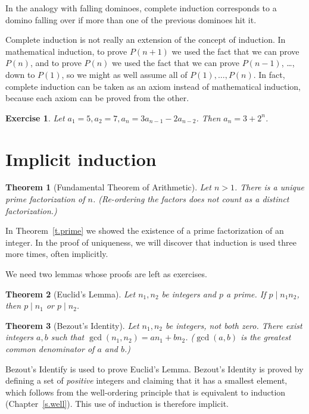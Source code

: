 \documentclass[11pt,a4paper]{report}
\newtheorem{theorem}{Theorem}
\newtheorem{exercise}{Exercise}
\begin{document}
In the analogy with falling dominoes, complete induction corresponds to a domino falling over if more than one of the previous dominoes hit it.

Complete induction is not really an extension of the concept of induction. In mathematical induction, to prove $P(n+1)$ we used the fact that we can prove $P(n)$, and to prove $P(n)$ we used the fact that we can prove $P(n-1)$, \ldots, down to $P(1)$, so we might as well assume all of $P(1),\ldots,P(n)$. In fact, complete induction can be taken as an axiom instead of mathematical induction, because each axiom can be proved from the other.

\begin{exercise}
Let $a_1=5, a_2=7, a_n=3a_{n-1} - 2a_{n-2}$. Then $a_n=3+2^n$.
\end{exercise}

\section{Implicit induction}\label{s.unique}

\begin{theorem}[Fundamental Theorem of Arithmetic]
Let $n>1$. There is a \emph{unique} prime factorization of $n$. (Re-ordering the factors does not count as a distinct factorization.)
\end{theorem}

In Theorem~\ref{t.prime} we showed the existence of a prime factorization of an integer. In the proof of uniqueness, we will discover that induction is used three more times, often implicitly.

We need two lemmas whose proofs are left as exercises.

\begin{theorem}[Euclid's Lemma]
Let $n_1,n_2$ be integers and $p$ a prime. If $p \mid n_1 n_2$, then $p\mid n_1$ or $p\mid n_2$.
\end{theorem}

\begin{theorem}[Bezout's Identity]
Let $n_1, n_2$ be integers, not both zero. There exist integers $a,b$ such that $\gcd(n_1,n_2)=an_1+bn_2$. ($\gcd(a,b)$ is the greatest common denominator of $a$ and $b$.)
\end{theorem}

Bezout's Identify is used to prove Euclid's Lemma. Bezout's Identity is proved by defining a set of \emph{positive} integers and claiming that it has a smallest element, which follows from the well-ordering principle that is equivalent to induction (Chapter~\ref{s.well}). This use of induction is therefore implicit.
\end{document}
